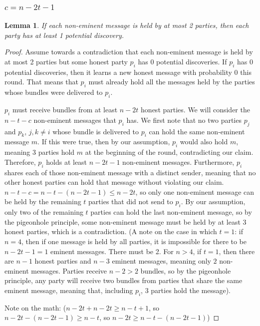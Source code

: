 \documentclass{article}
\newtheorem{lemma}{Lemma}
\begin{document}
\subsubsection{$c = n - 2t - 1$}
\begin{lemma}
If each non-eminent message is held by at most 2 parties, then each party has at least 1 potential discovery.
\end{lemma}
\begin{proof}
Assume towards a contradiction that each non-eminent message is held by at most 2 parties but some honest party $p_i$ has 0 potential discoveries. If $p_i$ has 0 potential discoveries, then it learns a new honest message with probability 0 this round. That means that $p_i$ must already hold all the messages held by the parties whose bundles were delivered to $p_i$. 

$p_i$ must receive bundles from at least $n - 2t$ honest parties. We will consider the $n - t - c$ non-eminent messages that $p_i$ has. We first note that no two parties $p_j$ and $p_k$, $j,k \neq i$ whose bundle is delivered to $p_i$ can hold the same non-eminent message $m$. If this were true, then by our assumption, $p_i$ would also hold $m$, meaning 3 parties hold $m$ at the beginning of the round, contradicting our claim. Therefore, $p_i$ holds at least $n - 2t - 1$ non-eminent messages. Furthermore, $p_i$ shares each of those non-eminent message with a distinct sender, meaning that no other honest parties can hold that message without violating our claim. $n - t - c = n - t - (n - 2t - 1) \leq n - 2t$, so only one non-eminent message can be held by the remaining $t$ parties that did not send to $p_i$. By our assumption, only two of the remaining $t$ parties can hold the last non-eminent message, so by the pigeonhole principle, some non-eminent message must be held by at least 3 honest parties, which is a contradiction. (A note on the case in which $t = 1$: if $n = 4$, then if one message is held by all parties, it is impossible for there to be $n - 2t - 1 = 1$ eminent messages. There must be 2. For $n > 4$, if $t = 1$, then there are $n - 1$ honest parties and $n - 3$ eminent messages, meaning only $2$ non-eminent messages. Parties receive $n - 2 > 2$ bundles, so by the pigeonhole principle, any party will receive two bundles from parties that share the same eminent message, meaning that, including $p_i$, 3 parties hold the message).


Note on the math: ($n - 2t + n - 2t \geq n - t + 1$, so $n - 2t - (n - 2t - 1) \geq n - t$, so $n - 2t \geq n - t - (n - 2t - 1)$)


\end{proof}
\end{document}
